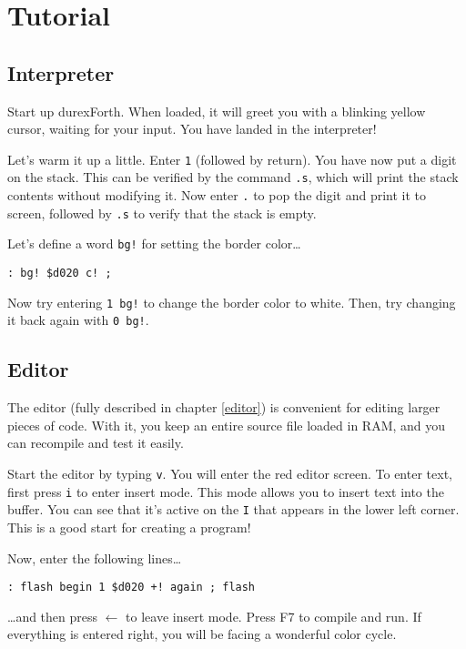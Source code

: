 \chapter{Tutorial}

\section{Interpreter}

Start up durexForth. When loaded, it will greet you with a blinking yellow
cursor, waiting for your input. You have landed in the interpreter!

Let's warm it up a little. Enter \texttt{1} (followed by return). You have
now put a digit on the stack. This can be verified by the command
\texttt{.s}, which will print the stack contents without modifying it. Now
enter \texttt{.} to pop the digit and print it to screen, followed by
\texttt{.s} to verify that the stack is empty.

Let's define a word \texttt{bg!} for setting the border color\ldots

\begin{verbatim}
: bg! $d020 c! ;
\end{verbatim}

Now try entering \texttt{1 bg!} to change the border color to white.
Then, try changing it back again with \texttt{0 bg!}.

\section{Editor}

The editor (fully described in chapter \ref{editor}) is convenient for
editing larger pieces of code. With it, you keep an entire source file
loaded in RAM, and you can recompile and test it easily.

Start the editor by typing \texttt{v}. You will enter the red editor
screen. To enter text, first press \texttt{i} to enter insert mode. This
mode allows you to insert text into the buffer. You can see that it's
active on the \texttt{I} that appears in the lower left corner. This is a
good start for creating a program!

Now, enter the following lines\ldots

\begin{verbatim}
: flash begin 1 $d020 +! again ; flash
\end{verbatim}

\ldots and then press $\leftarrow$ to leave insert mode.
Press \textsc{F7} to compile and run. If everything is entered right, you
will be facing a wonderful color cycle.

